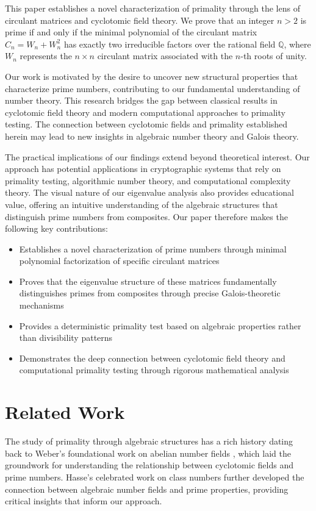 This paper establishes a novel characterization of primality through the lens of circulant matrices and cyclotomic field theory. We prove that an integer $n > 2$ is prime if and only if the minimal polynomial of the circulant matrix $C_n = W_n + W_n^2$ has exactly two irreducible factors over the rational field $\mathbb{Q}$, where $W_n$ represents the $n \times n$ circulant matrix associated with the $n$-th roots of unity.

Our work is motivated by the desire to uncover new structural properties that characterize prime numbers, contributing to our fundamental understanding of number theory. This research bridges the gap between classical results in cyclotomic field theory and modern computational approaches to primality testing. The connection between cyclotomic fields and primality established herein may lead to new insights in algebraic number theory and Galois theory.

The practical implications of our findings extend beyond theoretical interest. Our approach has potential applications in cryptographic systems that rely on primality testing, algorithmic number theory, and computational complexity theory. The visual nature of our eigenvalue analysis also provides educational value, offering an intuitive understanding of the algebraic structures that distinguish prime numbers from composites. Our paper therefore makes the following key contributions:
\begin{itemize}
\item Establishes a novel characterization of prime numbers through minimal polynomial factorization of specific circulant matrices
\item Proves that the eigenvalue structure of these matrices fundamentally distinguishes primes from composites through precise Galois-theoretic mechanisms
\item Provides a deterministic primality test based on algebraic properties rather than divisibility patterns
\item Demonstrates the deep connection between cyclotomic field theory and computational primality testing through rigorous mathematical analysis
\end{itemize}

\section{Related Work}

The study of primality through algebraic structures has a rich history dating back to Weber's foundational work on abelian number fields \cite{weber1886theorie}, which laid the groundwork for understanding the relationship between cyclotomic fields and prime numbers. Hasse's celebrated work on class numbers \cite{hasse1952klassenzahl} further developed the connection between algebraic number fields and prime properties, providing critical insights that inform our approach.

